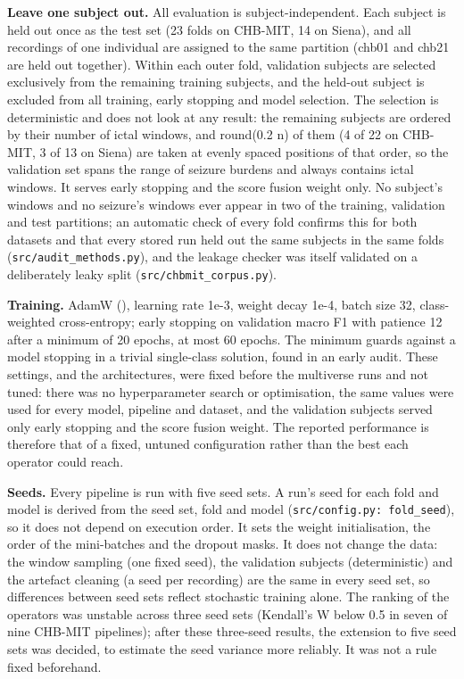 \documentclass[11pt,a4paper]{article}
\begin{document}
\textbf{Leave one subject out.} All evaluation is subject-independent. Each subject is held
out once as the test set (23 folds on CHB-MIT, 14 on Siena), and all recordings of one
individual are assigned to the same partition (chb01 and chb21 are held out together).
Within each outer fold, validation subjects are selected exclusively from the remaining
training subjects, and the held-out subject is excluded from all training, early
stopping and model selection. The selection is deterministic and does not look at
any result: the remaining subjects are ordered by their number of ictal windows, and
round(0.2 n) of them (4 of 22 on CHB-MIT, 3 of 13 on Siena) are taken at evenly spaced
positions of that order, so the validation set spans the range of seizure burdens and
always contains ictal windows. It serves early stopping and the score fusion weight
only. No subject's windows and no seizure's windows ever appear in two of the
training, validation and test partitions; an automatic check of every fold confirms
this for both datasets and that every stored run held out the same subjects in the
same folds (\nolinkurl{src/audit_methods.py}), and the leakage checker was itself validated on a
deliberately leaky split (\nolinkurl{src/chbmit_corpus.py}).

\textbf{Training.} AdamW (\citealp{Loshchilov_2019}), learning rate 1e-3, weight decay
1e-4, batch size 32, class-weighted cross-entropy; early stopping on validation macro
F1 with patience 12 after a minimum of 20 epochs, at most 60 epochs. The minimum guards
against a model stopping in a trivial single-class solution, found in an early audit.
These settings, and the architectures, were fixed before the multiverse runs and not
tuned: there was no hyperparameter search or optimisation, the same values were used
for every model, pipeline and dataset, and the validation subjects served only early
stopping and the score fusion weight. The reported performance is therefore that of a
fixed, untuned configuration rather than the best each operator could reach.

\textbf{Seeds.} Every pipeline is run with five seed sets. A run's seed for each fold and
model is derived from the seed set, fold and model (\texttt{src/config.py:\ fold\_seed}), so it
does not depend on execution order. It sets the weight initialisation, the order of
the mini-batches and the dropout masks. It does not change the data: the window
sampling (one fixed seed), the validation subjects (deterministic) and the artefact
cleaning (a seed per recording) are the same in every seed set, so differences between
seed sets reflect stochastic training alone. The ranking of the operators was unstable across
three seed sets (Kendall's W below 0.5 in seven of nine CHB-MIT pipelines); after these
three-seed results, the extension to five seed sets was decided,
to estimate the seed variance more reliably. It was not a rule fixed beforehand.
\end{document}
